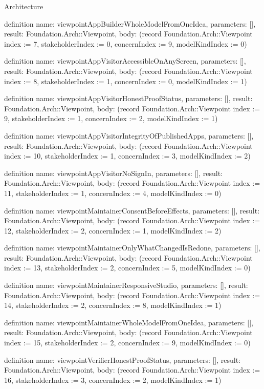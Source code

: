 \begin{lexlean}{Architecture}
\begin{semanticmodule}
definition{
  name: viewpointAppBuilderWholeModelFromOneIdea,
  parameters: [],
  result: Foundation.Arch::Viewpoint,
  body: (record Foundation.Arch::Viewpoint {index := 7, stakeholderIndex := 0, concernIndex := 9, modelKindIndex := 0})
}

definition{
  name: viewpointAppVisitorAccessibleOnAnyScreen,
  parameters: [],
  result: Foundation.Arch::Viewpoint,
  body: (record Foundation.Arch::Viewpoint {index := 8, stakeholderIndex := 1, concernIndex := 0, modelKindIndex := 1})
}

definition{
  name: viewpointAppVisitorHonestProofStatus,
  parameters: [],
  result: Foundation.Arch::Viewpoint,
  body: (record Foundation.Arch::Viewpoint {index := 9, stakeholderIndex := 1, concernIndex := 2, modelKindIndex := 1})
}

definition{
  name: viewpointAppVisitorIntegrityOfPublishedApps,
  parameters: [],
  result: Foundation.Arch::Viewpoint,
  body: (record Foundation.Arch::Viewpoint {index := 10, stakeholderIndex := 1, concernIndex := 3, modelKindIndex := 2})
}

definition{
  name: viewpointAppVisitorNoSignIn,
  parameters: [],
  result: Foundation.Arch::Viewpoint,
  body: (record Foundation.Arch::Viewpoint {index := 11, stakeholderIndex := 1, concernIndex := 4, modelKindIndex := 0})
}

definition{
  name: viewpointMaintainerConsentBeforeEffects,
  parameters: [],
  result: Foundation.Arch::Viewpoint,
  body: (record Foundation.Arch::Viewpoint {index := 12, stakeholderIndex := 2, concernIndex := 1, modelKindIndex := 2})
}

definition{
  name: viewpointMaintainerOnlyWhatChangedIsRedone,
  parameters: [],
  result: Foundation.Arch::Viewpoint,
  body: (record Foundation.Arch::Viewpoint {index := 13, stakeholderIndex := 2, concernIndex := 5, modelKindIndex := 0})
}

definition{
  name: viewpointMaintainerResponsiveStudio,
  parameters: [],
  result: Foundation.Arch::Viewpoint,
  body: (record Foundation.Arch::Viewpoint {index := 14, stakeholderIndex := 2, concernIndex := 8, modelKindIndex := 1})
}

definition{
  name: viewpointMaintainerWholeModelFromOneIdea,
  parameters: [],
  result: Foundation.Arch::Viewpoint,
  body: (record Foundation.Arch::Viewpoint {index := 15, stakeholderIndex := 2, concernIndex := 9, modelKindIndex := 0})
}

definition{
  name: viewpointVerifierHonestProofStatus,
  parameters: [],
  result: Foundation.Arch::Viewpoint,
  body: (record Foundation.Arch::Viewpoint {index := 16, stakeholderIndex := 3, concernIndex := 2, modelKindIndex := 1})
}


\end{semanticmodule}
\end{lexlean}
